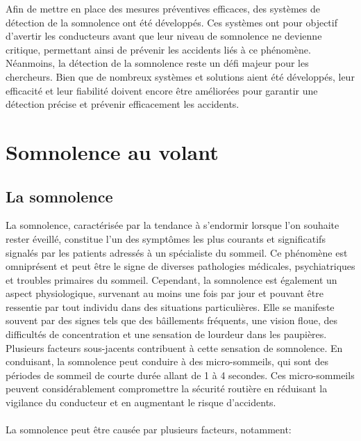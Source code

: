 Afin de mettre en place des mesures préventives efficaces, des systèmes de détection de la somnolence ont été développés. Ces systèmes ont pour objectif d'avertir les conducteurs avant que leur niveau de somnolence ne devienne critique, permettant ainsi de prévenir les accidents liés à ce phénomène. Néanmoins, la détection de la somnolence reste un défi majeur pour les chercheurs. Bien que de nombreux systèmes et solutions aient été développés, leur efficacité et leur fiabilité doivent encore être améliorées pour garantir une détection précise et prévenir efficacement les accidents.

\section{Somnolence au volant}
\subsection{La somnolence}
La somnolence, caractérisée par la tendance à s'endormir lorsque l'on souhaite rester éveillé, constitue l'un des symptômes les plus courants et significatifs signalés par les patients adressés à un spécialiste du sommeil. Ce phénomène est omniprésent et peut être le signe de diverses pathologies médicales, psychiatriques et troubles primaires du sommeil. Cependant, la somnolence est également un aspect physiologique, survenant au moins une fois par jour et pouvant être ressentie par tout individu dans des situations particulières\cite{haba2011somnolence}. Elle se manifeste souvent par des signes tels que des bâillements fréquents, une vision floue, des difficultés de concentration et une sensation de lourdeur dans les paupières. Plusieurs facteurs sous-jacents contribuent à cette sensation de somnolence. En conduisant, la somnolence peut conduire à des micro-sommeils, qui sont des périodes de sommeil de courte durée allant de 1 à 4 secondes\cite{somnolence}. Ces micro-sommeils peuvent considérablement compromettre la sécurité routière en réduisant la vigilance du conducteur et en augmentant le risque d'accidents.\\ \\
La somnolence peut être causée par plusieurs facteurs, notamment:

